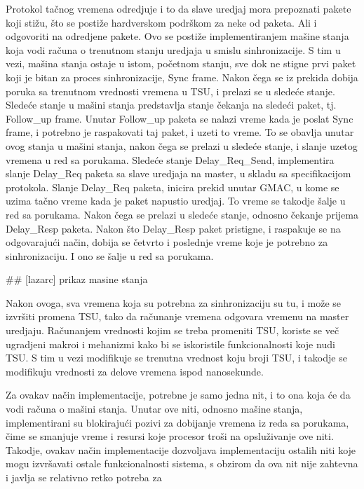 \documentclass[a4paper,12pt, master]{etf}
\begin{document}
        Protokol ta\v{c}nog vremena odredjuje i to da slave uredjaj mora
        prepoznati pakete koji sti\v{z}u, \v{s}to se posti\v{z}e
        hardverskom podr\v{s}kom za neke od paketa. Ali i odgovoriti na
        odredjene pakete. Ovo se posti\v{z}e implementiranjem ma\v{s}ine stanja
        koja vodi ra\v{c}una o trenutnom stanju uredjaja u smislu
        sinhronizacije. S tim u vezi, ma\v{s}ina stanja ostaje u istom,
        po\v{c}etnom stanju, sve dok ne stigne prvi paket koji je bitan za
        proces sinhronizacije, Sync frame. Nakon \v{c}ega se iz prekida dobija
        poruka sa trenutnom vrednosti vremena u TSU, i prelazi se u slede\'{c}e
        stanje. Slede\'{c}e stanje u ma\v{s}ini stanja predstavlja stanje
        \v{c}ekanja na slede\'{c}i paket, tj. Follow\_up frame. Unutar
        Follow\_up paketa se nalazi vreme kada je poslat Sync frame, i potrebno
        je raspakovati taj paket, i uzeti to vreme. To se obavlja unutar ovog
        stanja u ma\v{s}ini stanja, nakon \v{c}ega se prelazi u slede\'{c}e
        stanje, i slanje uzetog vremena u red sa porukama. Slede\'{c}e stanje
        Delay\_Req\_Send, implementira slanje Delay\_Req paketa sa slave
        uredjaja na master, u skladu sa specifikacijom protokola. Slanje
        Delay\_Req paketa, inicira prekid unutar GMAC, u kome se uzima ta\v{c}no
        vreme kada je paket napustio uredjaj. To vreme se takodje \v{s}alje u
        red sa porukama. Nakon \v{c}ega se prelazi u slede\'{c}e stanje,
        odnosno \v{c}ekanje prijema Delay\_Resp paketa. Nakon \v{s}to
        Delay\_Resp paket pristigne, i raspakuje se na odgovaraju\'{c}i
        na\v{c}in, dobija se \v{c}etvrto i poslednje vreme koje je potrebno za
        sinhronizaciju. I ono se \v{s}alje u red sa porukama.

        \#\# [lazarc] prikaz masine stanja

        Nakon ovoga, sva vremena koja su potrebna za sinhronizaciju su tu, i
        mo\v{z}e se izvr\v{s}iti promena TSU, tako da ra\v{c}unanje vremena
        odgovara vremenu na master uredjaju. Ra\v{c}unanjem vrednosti kojim se
        treba promeniti TSU, koriste se ve\v{c} ugradjeni makroi i mehanizmi
        kako bi se iskoristile funkcionalnosti koje nudi TSU\@. S tim u vezi
        modifikuje se trenutna vrednost koju broji TSU, i takodje se modifikuju
        vrednosti za delove vremena ispod nanosekunde.

        Za ovakav na\v{c}in implementacije, potrebne je samo jedna nit, i to
        ona koja \'{c}e da vodi ra\v{c}una o ma\v{s}ini stanja. Unutar ove
        niti, odnosno ma\v{s}ine stanja, implementirani su blokiraju\'{c}i
        pozivi za dobijanje vremena iz reda sa porukama, \v{c}ime se smanjuje
        vreme i resursi koje procesor tro\v{s}i na opslu\v{z}ivanje ove niti.
        Takodje, ovakav na\v{c}in implementacije dozvoljava implementaciju
        ostalih niti koje mogu izvr\v{s}avati ostale funkcionalnosti sistema, s
        obzirom da ova nit nije zahtevna i javlja se relativno retko potreba za
\end{document}

